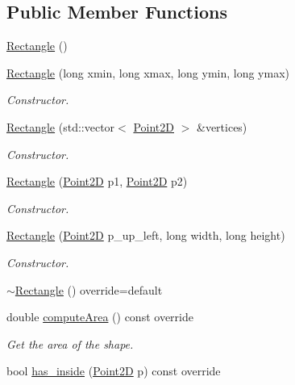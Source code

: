 \subsection*{Public Member Functions}
\begin{DoxyCompactItemize}
\item 
\hyperlink{classGeometry_1_1Rectangle_a3a73665b3e36e9d73968ca77eece4552}{Rectangle} ()
\item 
\hyperlink{classGeometry_1_1Rectangle_a6e9d73d75bafe76243b6939f0630897c}{Rectangle} (long xmin, long xmax, long ymin, long ymax)
\begin{DoxyCompactList}\small\item\em Constructor. \end{DoxyCompactList}\item 
\hyperlink{classGeometry_1_1Rectangle_af43cb3bd05884b9edd3cadfacbf379f7}{Rectangle} (std\+::vector$<$ \hyperlink{classGeometry_1_1Point2D}{Point2D} $>$ \&vertices)
\begin{DoxyCompactList}\small\item\em Constructor. \end{DoxyCompactList}\item 
\hyperlink{classGeometry_1_1Rectangle_a03200e2f3bb2e4fca3b2f76d768e5c95}{Rectangle} (\hyperlink{classGeometry_1_1Point2D}{Point2D} p1, \hyperlink{classGeometry_1_1Point2D}{Point2D} p2)
\begin{DoxyCompactList}\small\item\em Constructor. \end{DoxyCompactList}\item 
\hyperlink{classGeometry_1_1Rectangle_ae609ed3d87f6dc59d5a0aae1c17709aa}{Rectangle} (\hyperlink{classGeometry_1_1Point2D}{Point2D} p\+\_\+up\+\_\+left, long width, long height)
\begin{DoxyCompactList}\small\item\em Constructor. \end{DoxyCompactList}\item 
\hyperlink{classGeometry_1_1Rectangle_a29f446cb310ac71f9826ee9c8226191b}{$\sim$\+Rectangle} () override=default
\item 
double \hyperlink{classGeometry_1_1Rectangle_adcae3b63e18582f1d4983dfa80029fb7}{compute\+Area} () const override
\begin{DoxyCompactList}\small\item\em Get the area of the shape. \end{DoxyCompactList}\item 
bool \hyperlink{classGeometry_1_1Rectangle_ab186008b8f7c4b99fec564021c40e3eb}{has\+\_\+inside} (\hyperlink{classGeometry_1_1Point2D}{Point2D} p) const override

\end{DoxyCompactItemize}
